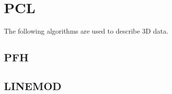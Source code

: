 \section{PCL}
\label{pcl}

		
The following algorithms are used to describe 3D data. 
		\subsection{PFH}
		\label{pfh}
		
		\subsection{LINEMOD}
